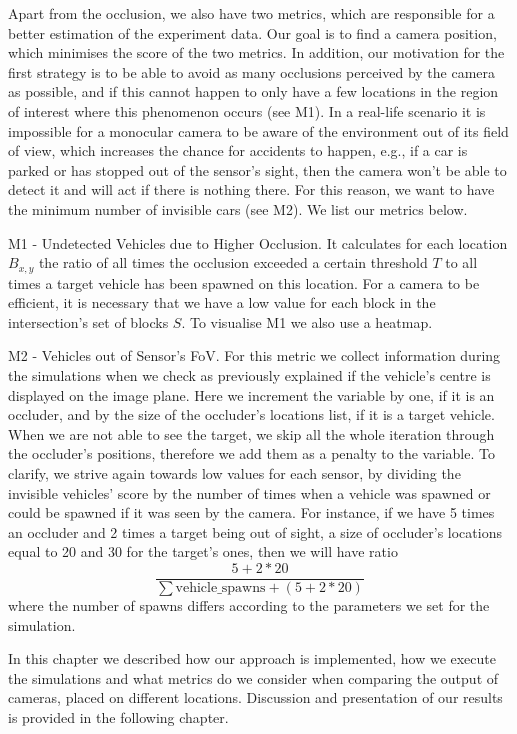 Apart from the occlusion, we also have two metrics, which are responsible for a better estimation of the experiment data. Our goal is to find a camera position, which minimises the score of the two metrics. In addition, our motivation for the first strategy is to be able to avoid as many occlusions perceived by the camera as possible, and if this cannot happen to only have a few locations in the region of interest where this phenomenon occurs (see M1). In a real-life scenario it is impossible for a monocular camera to be aware of the environment out of its field of view, which increases the chance for accidents to happen, e.g., if a car is parked or has stopped out of the sensor's sight, then the camera won't be able to detect it and will act if there is nothing there. For this reason, we want to have the minimum number of invisible cars (see M2). We list our metrics below.

M1 - Undetected Vehicles due to Higher Occlusion. It calculates for each location $B_{x,y}$ the ratio of all times the occlusion exceeded a certain threshold $T$ to all times a target vehicle has been spawned on this location. For a camera to be efficient, it is necessary that we have a low value for each block in the intersection's set of blocks $S$. To visualise M1 we also use a heatmap.

M2 - Vehicles out of Sensor's FoV. For this metric we collect information during the simulations when we check as previously explained if the vehicle's centre is displayed on the image plane. Here we increment the variable by one, if it is an occluder, and by the size of the occluder's locations list, if it is a target vehicle. When we are not able to see the target, we skip all the whole iteration through the occluder's positions, therefore we add them as a penalty to the variable. To clarify, we strive again towards low values for each sensor, by dividing the invisible vehicles' score by the number of times when a vehicle was spawned or could be spawned if it was seen by the camera. For instance, if we have 5 times an occluder and 2 times a target being out of sight, a size of occluder's locations equal to 20 and 30 for the target's ones, then we will have ratio
\begin{equation}
    \frac{5 + 2 * 20}{\sum\textrm{vehicle\_spawns} + (5 + 2 *20)}
\end{equation}
where the number of spawns differs according to the parameters we set for the simulation.

In this chapter we described how our approach is implemented, how we execute the simulations and what metrics do we consider when comparing the output of cameras, placed on different locations. Discussion and presentation of our results is provided in the following chapter.